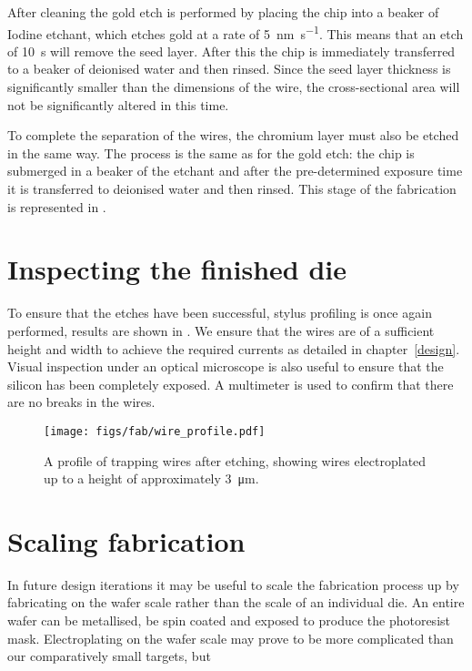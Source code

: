 %
After cleaning the gold etch is performed by placing the chip into a beaker of
Iodine etchant, which etches gold at a rate of \SI{5}{\nano\meter\per\second}.
This means that an etch of \SI{10}{\second} will remove the seed layer. After
this the chip is immediately transferred to a beaker of deionised water and
then rinsed. Since the seed layer thickness is significantly smaller than the
dimensions of the wire, the cross-sectional area will not be significantly
altered in this time.

%
To complete the separation of the wires, the chromium layer must also be etched
in the same way. The process is the same as for the gold etch: the chip is
submerged in a beaker of the etchant and after the pre-determined exposure time
it is transferred to deionised water and then rinsed. This stage of the
fabrication is represented in . 

\section{Inspecting the finished die}

To ensure that the etches have been successful, stylus profiling is once again
performed, results are shown in . We ensure that
the wires are of a sufficient height and width to achieve the required currents
as detailed in chapter~\ref{design}. Visual inspection under an optical
microscope is also useful to ensure that the silicon has been completely
exposed. A multimeter is used to confirm that there are no breaks in the wires.

\begin{figure}
\centering
  \texttt{[image: figs/fab/wire\_profile.pdf]}
  \caption{A profile of trapping wires after etching, showing wires
  electroplated up to a height of approximately \SI{3}{\micro\meter}.
  }
  \label{fab:fig:endprofile}
\end{figure}

\section{Scaling fabrication}

In future design iterations it may be useful to scale the fabrication process
up by fabricating on the wafer scale rather than the scale of an individual
die. An entire wafer can be metallised, be spin coated and exposed to
produce the photoresist mask. Electroplating on the wafer scale may prove to be
more complicated than our comparatively small targets, but 

